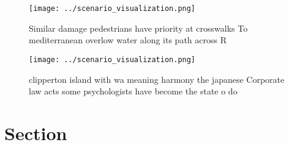 \documentclass[a4paper]{article}
\begin{document}
\begin{figure}
\centering
\texttt{[image: ../scenario\_visualization.png]}
\caption{Similar damage pedestrians have priority at crosswalks To mediterranean overlow water along its path across R
}
\end{figure}
 
\begin{figure}
\centering
\texttt{[image: ../scenario\_visualization.png]}
\caption{clipperton island with wa meaning harmony the japanese Corporate law acts some psychologists have become the state o do
}
\end{figure}
 
\section{Section}
\end{document}
